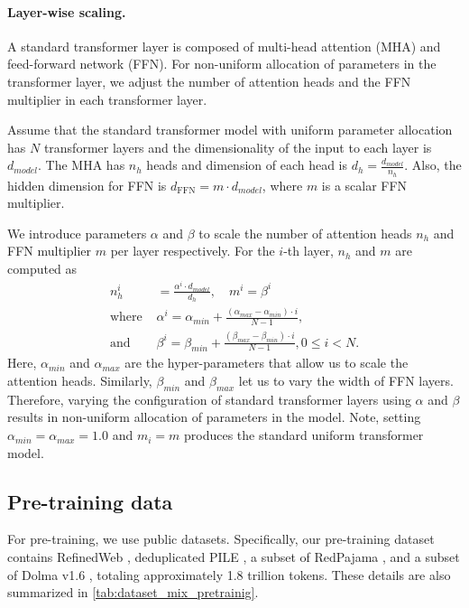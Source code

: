 \documentclass[10pt,twocolumn,letterpaper]{article}
\begin{document}
\paragraph{Layer-wise scaling.} A standard transformer layer is composed of multi-head attention (MHA) and feed-forward network (FFN). For non-uniform allocation of parameters in the transformer layer, we adjust the number of attention heads and the FFN multiplier in each transformer layer.

Assume that the standard transformer model with uniform parameter allocation has $N$ transformer layers and the dimensionality of the input to each layer is $d_{model}$. The MHA has $n_h$ heads and dimension of each head is $d_h =\frac{d_{model}}{n_h}$. Also, the hidden dimension for FFN is $d_{\textrm{FFN}} = m \cdot d_{model}$, where $m$ is a scalar FFN multiplier. 

We introduce parameters $\alpha$ and $\beta$ to scale the number of attention heads $n_h$ and FFN multiplier $m$ per layer respectively. For the $i$-th layer, $n_h$ and $m$ are computed as
\begin{equation}
    \begin{split}
    n^i_h & = \frac{\alpha^i \cdot d_{model} }{d_h}, \quad m^i = \beta^i \\
    \text{where } & \alpha^i = \alpha_{min} + \frac{(\alpha_{max} - \alpha_{min})\cdot i}{N - 1}, \\ \text{and } & \beta^i = \beta_{min} + \frac{(\beta_{max} - \beta_{min}) \cdot i}{N - 1}, 0 \le i < N.
    \end{split}
    \label{eq:layer_wise_scale}
\end{equation}
Here, $\alpha_{min}$ and $\alpha_{max}$ are the hyper-parameters that allow us to scale the attention heads. Similarly, $\beta_{min}$ and $\beta_{max}$ let us to vary the width of FFN layers. Therefore, varying the configuration of standard transformer layers using $\alpha$ and $\beta$ results in non-uniform allocation of parameters in the model. Note, setting $\alpha_{min} = \alpha_{max} = 1.0$ and $m_i=m$ produces the standard uniform transformer model.

\subsection{Pre-training data}
\label{ssec:pretrain_data}

For pre-training, we use public datasets. Specifically, our pre-training dataset contains RefinedWeb \cite{penedo2023refinedweb}, deduplicated PILE \cite{gao2020pile}, a subset of RedPajama \cite{together2023redpajama}, and a subset of Dolma v1.6 \cite{soldaini2024dolma}, totaling approximately 1.8 trillion tokens. These details are also summarized in \cref{tab:dataset_mix_pretrainig}.
\end{document}
